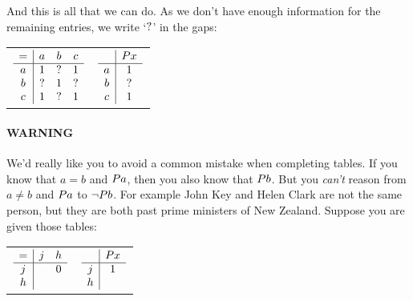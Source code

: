 \documentclass[PHIL101-Textbook.tex]{subfiles}
\begin{document}
\noindent And this is all that we can do. As we don't have enough information for the remaining entries, we write `$?$' in the gaps: 

\begin{center}
  \begin{tabular}{ll}
	$\begin{array}{c|ccc}
	 = & a & b & c\\ \hline
	 a & \vT & \vU & \vT\\
	 b & \vU & \vT & \vU\\
	 c & \vT & \vU & \vT
	 \end{array}$
	&
	$\begin{array}{c|c}
	   & \atom P x \\ \hline
	 a & \vT\\
	 b & \vU\\
	 c & \vT
						
	 \end{array}$
  \end{tabular}
\end{center}


\paragraph{WARNING} We'd really like you to avoid a common mistake when completing tables. If you know that $a=b$ and $\mathord{P}{a}$, then you also know that $\mathord{P}{b}$. But you \emph{can't} reason from $a \neq b$ and  $\mathord{P}{a}$ to $\neg \mathord{P}{b}$. For example John Key and Helen Clark are not the same person, but they are both past prime ministers of New Zealand. Suppose you are given those tables: 

\begin{center}
  \begin{tabular}{ll}
  $\begin{array}{c|cc}
	   = & j & h\\ \hline
	   j && 0\\
	   h
	 \end{array}$  & $\begin{array}{c|c}
	   & \mathord{P}{x} \\ \hline
	   j & 1\\
	   h & 
	 \end{array}$
  \end{tabular}
\end{center}
\end{document}
